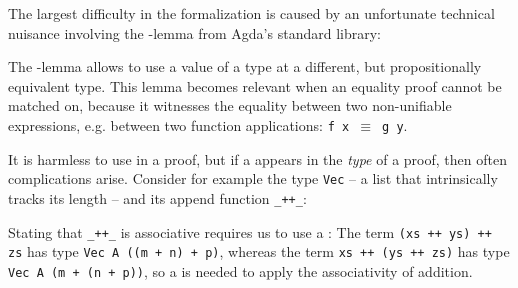 \documentclass[acmsmall,anonymous,review,screen]{acmart}
\begin{document}
The largest difficulty in the formalization is caused by an unfortunate
technical nuisance involving the {\Asubst}-lemma from Agda's standard library:

\SubstExamplesDef

The {\Asubst}-lemma allows to use a value of a type at a different,
but propositionally equivalent type.
This lemma becomes relevant when an equality proof cannot be matched
on, because it witnesses the equality between two non-unifiable
expressions, e.g. between two function applications: \texttt{f x $\equiv$ g y}.

It is harmless to use {\Asubst} in a proof, but if a {\Asubst} appears
in the \emph{type} of a proof, then often complications arise.
Consider for example the type \texttt{Vec} -- a list that
intrinsically tracks its length -- and its append function \verb/_++_/:
\SubstExamplesVec
\SubstExamplesAppend

Stating that \verb/_++_/ is associative requires us to use a {\Asubst}:
\SubstExamplesAssocType
The term \texttt{(xs ++ ys) ++ zs} has type \texttt{Vec A ((m + n) + p)}, whereas
the term \texttt{xs ++ (ys ++ zs)} has type \texttt{Vec A (m + (n + p))}, so a
{\Asubst} is needed to apply the associativity of addition.

\SubstExamplesAppendR

\SubstExamplesAssocR

\SubstExamplesAssocRHet

\SubstExamplesDistSubst
\SubstExamplesSubstRemovable






\end{document}

